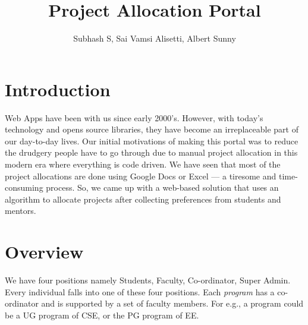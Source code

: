 \documentclass{article}
\title{Project Allocation Portal}
\author{Subhash S, Sai Vamsi Alisetti, Albert Sunny}
\affil{Indian Institute of Technology Palakkad}
\date{}
\begin{document}
\maketitle

\section{Introduction}

Web Apps have been with us since early 2000's. However, with today's technology and opens source libraries, they have become an irreplaceable part of our day-to-day lives. Our initial motivations of making this portal was to reduce the drudgery people have to go through due to manual project allocation in this modern era where everything is code driven. We have seen that most of the project allocations are done using Google Docs or Excel --- a tiresome and time-consuming process. So, we came up with a web-based solution that uses an algorithm to allocate projects after collecting preferences from students and mentors. 

\section{Overview}
We have four positions namely Students, Faculty, Co-ordinator, Super Admin. Every individual falls into one of these four positions. Each \emph{program} has a co-ordinator and is supported by a set of faculty members. For e.g., a program could be a UG program of CSE, or the PG program of EE.
\end{document}
